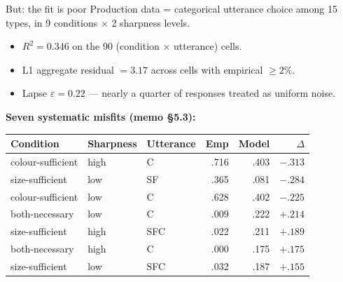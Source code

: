 \documentclass[10pt,aspectratio=169]{beamer}
\newcommand{\hl}[1]{{\color{hlblue}\textbf{#1}}}
\newcommand{\bad}[1]{{\color{hlred}#1}}
\begin{document}
\begin{frame}{But: the fit is poor}
\small
Production data = categorical utterance choice among 15 types, in 9 conditions $\times$ 2 sharpness levels.

\vspace{0.3em}
\begin{itemize}\itemsep0.2em
  \item \bad{$R^2 = 0.346$} on the 90 (condition $\times$ utterance) cells.
  \item \bad{L1 aggregate residual $= 3.17$} across cells with empirical $\geq 2\%$.
  \item Lapse $\varepsilon = 0.22$ --- nearly a quarter of responses treated as uniform noise.
\end{itemize}

\vspace{0.5em}
\hl{Seven systematic misfits (memo \S5.3):}
\begin{center}
\footnotesize
\begin{tabular}{lll rrr}
\toprule
Condition & Sharpness & Utterance & Emp & Model & $\Delta$\\
\midrule
colour-sufficient & high & C    & .716 & .403 & $-.313$\\
size-sufficient   & low  & SF   & .365 & .081 & $-.284$\\
colour-sufficient & low  & C    & .628 & .402 & $-.225$\\
both-necessary    & low  & C    & .009 & .222 & $+.214$\\
size-sufficient   & high & SFC  & .022 & .211 & $+.189$\\
both-necessary    & high & C    & .000 & .175 & $+.175$\\
size-sufficient   & low  & SFC  & .032 & .187 & $+.155$\\
\bottomrule
\end{tabular}
\end{center}
\end{frame}
\end{document}
